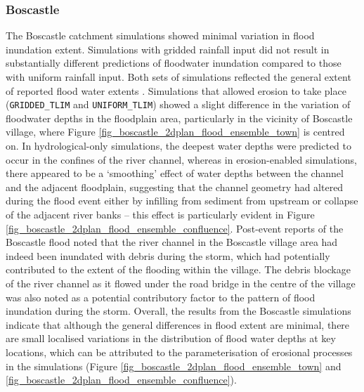 \subsubsection{Boscastle}
The Boscastle catchment simulations showed minimal variation in flood inundation extent. Simulations with gridded rainfall input did not result in substantially different predictions of floodwater inundation compared to those with uniform rainfall input. Both sets of simulations reflected the general extent of reported flood water extents \citep{wallingford2005flooding}. Simulations that allowed erosion to take place (\texttt{GRIDDED\_TLIM} and \texttt{UNIFORM\_TLIM}) showed a slight difference in the variation of floodwater depths in the floodplain area, particularly in the vicinity of Boscastle village, where Figure \ref{fig_boscastle_2dplan_flood_ensemble_town} is centred on. In hydrological-only simulations, the deepest water depths were predicted to occur in the confines of the river channel, whereas in erosion-enabled simulations, there appeared to be a `smoothing' effect of water depths between the channel and the adjacent floodplain, suggesting that the channel geometry had altered during the flood event either by infilling from sediment from upstream or collapse of the adjacent river banks -- this effect is particularly evident in Figure \ref{fig_boscastle_2dplan_flood_ensemble_confluence}. Post-event reports of the Boscastle flood noted that the river channel in the Boscastle village area had indeed been inundated with debris during the storm, which had potentially contributed to the extent of the flooding within the village. The debris blockage of the  river channel as it flowed under the road bridge in the centre of the village was also noted as a potential contributory factor to the pattern of flood inundation during the storm. Overall, the results from the Boscastle simulations indicate that although the general differences in flood extent are minimal, there are small localised variations in the distribution of flood water depths at key locations, which can be attributed to the parameterisation of erosional processes in the simulations (Figure \ref{fig_boscastle_2dplan_flood_ensemble_town} and \ref{fig_boscastle_2dplan_flood_ensemble_confluence}).

